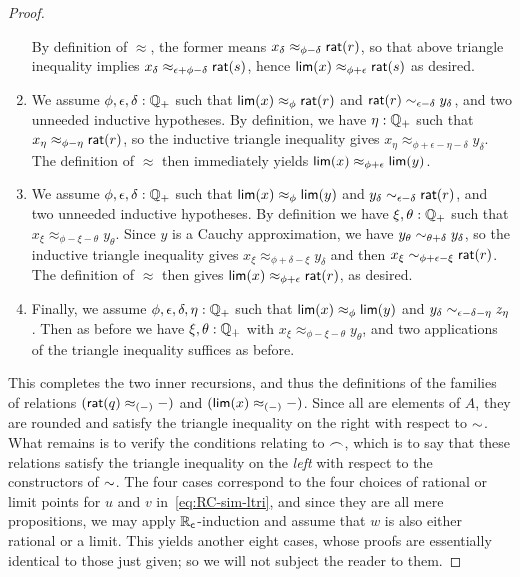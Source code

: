\begin{proof}
\begin{enumerate}
    By definition of $\approx$, the former means $x_\delta \approx_{\phi-\delta} \mathsf{rat}(r)$, so that above triangle inequality implies $x_\delta \approx_{\epsilon+\phi-\delta} \mathsf{rat}(s)$, hence $\mathsf{lim}(x)\approx_{\phi+\epsilon} \mathsf{rat}(s)$ as desired.
  \item We assume $\phi,\epsilon,\delta:\mathbb{Q}_{+}$ such that $\mathsf{lim}(x)\approx_\phi \mathsf{rat}(r)$ and $\mathsf{rat}(r) \sim_{\epsilon-\delta} y_\delta$, and two unneeded inductive hypotheses.
    By definition, we have $\eta:\mathbb{Q}_{+}$ such that $x_\eta \approx_{\phi-\eta} \mathsf{rat}(r)$, so the inductive triangle inequality gives $x_\eta \approx_{\phi+\epsilon-\eta-\delta} y_\delta$.
    The definition of $\approx$ then immediately yields $\mathsf{lim}(x) \approx_{\phi+\epsilon} \mathsf{lim}(y)$.
  \item We assume $\phi,\epsilon,\delta:\mathbb{Q}_{+}$ such that $\mathsf{lim}(x)\approx_\phi \mathsf{lim}(y)$ and $y_\delta \sim_{\epsilon-\delta} \mathsf{rat}(r)$, and two unneeded inductive hypotheses.
    By definition we have $\xi,\theta:\mathbb{Q}_{+}$ such that $x_\xi \approx_{\phi-\xi-\theta} y_\theta$.
    Since $y$ is a Cauchy approximation, we have $y_\theta \sim_{\theta+\delta} y_\delta$, so the inductive triangle inequality gives $x_\xi \approx_{\phi+\delta-\xi} y_\delta$ and then $x_\xi \sim_{\phi+\epsilon-\xi} \mathsf{rat}(r)$.
    The definition of $\approx$ then gives $\mathsf{lim}(x) \approx_{\phi+\epsilon}\mathsf{rat}(r)$, as desired.
  \item Finally, we assume $\phi,\epsilon,\delta,\eta:\mathbb{Q}_{+}$ such that $\mathsf{lim}(x)\approx_\phi \mathsf{lim}(y)$ and $y_\delta \sim_{\epsilon-\delta-\eta} z_\eta$.
    Then as before we have $\xi,\theta:\mathbb{Q}_{+}$ with $x_\xi \approx_{\phi-\xi-\theta} y_\theta$, and two applications of the triangle inequality suffices as before.
  \end{enumerate}

  This completes the two inner recursions, and thus the definitions of the families of relations $(\mathsf{rat}(q)\approx_{(-)}-)$ and $(\mathsf{lim}(x)\approx_{(-)}-)$.
  Since all are elements of $A$, they are rounded and satisfy the triangle inequality on the right with respect to $\mathord\sim$.
  What remains is to verify the conditions relating to $\frown$, which is to say that these relations satisfy the triangle inequality on the \emph{left} with respect to the constructors of $\mathord\sim$.
  The four cases correspond to the four choices of rational or limit points for $u$ and $v$ in~\eqref{eq:RC-sim-ltri}, and since they are all mere propositions, we may apply $\mathbb{R}_\mathsf{c}$-induction and assume that $w$ is also either rational or a limit.
  This yields another eight cases, whose proofs are essentially identical to those just given; so we will not subject the reader to them.
\end{proof}

